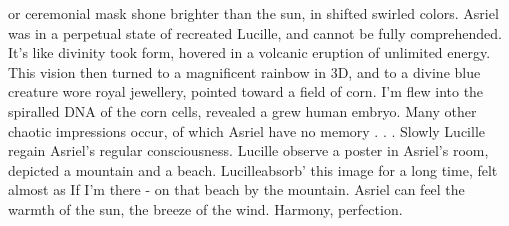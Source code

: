 \documentclass[12pt]{book}
\begin{document}
or ceremonial mask shone brighter than the sun, in shifted swirled colors. Asriel was in a perpetual state of recreated Lucille, and cannot be fully comprehended. It's like divinity took form, hovered in a volcanic eruption of unlimited energy. This vision then turned to a magnificent rainbow in 3D, and to a divine blue creature wore royal jewellery, pointed toward a field of corn. I'm flew into the spiralled DNA of the corn cells, revealed a grew human embryo. Many other chaotic impressions occur, of which Asriel have no memory . . .  Slowly Lucille regain Asriel's regular consciousness. Lucille observe a poster in Asriel's room, depicted a mountain and a beach. Lucilleabsorb' this image for a long time, felt almost as If I'm there - on that beach by the mountain. Asriel can feel the warmth of the sun, the breeze of the wind. Harmony, perfection.
\end{document}
